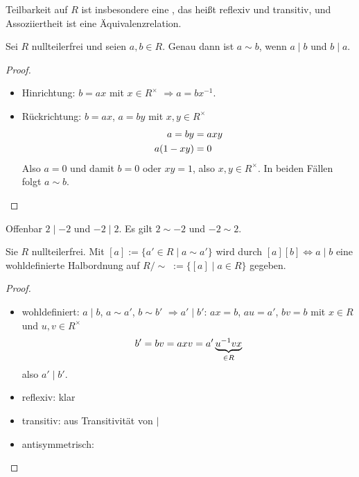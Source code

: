 \begin{remark}
	Teilbarkeit auf $R$ ist insbesondere eine , das heißt reflexiv und transitiv, und Assoziiertheit ist eine Äquivalenzrelation.
\end{remark}

\begin{lemma}
	Sei $R$ nullteilerfrei und seien $a,b\in R$. Genau dann ist $a\sim b$, wenn $a\mid b$ und $b\mid a$.
\end{lemma}
\begin{proof}
	\begin{itemize}
		\item Hinrichtung: $b=ax$ mit $x\in R^\times$ $\Rightarrow a=bx^{-1}$.
		\item Rückrichtung: $b=ax$, $a=by$ mit $x,y\in R^\times$
		\begin{align}
			a=by&=axy \notag \\
			a(1-xy)&= 0 \notag
		\end{align}
		Also $a=0$ und damit $b=0$ oder $xy=1$, also $x,y\in R^\times$. In beiden Fällen folgt $a\sim b$.
	\end{itemize}
\end{proof}

\begin{*example}
	Offenbar $2\mid -2$ und $-2\mid 2$. Es gilt $2\sim -2$ und $-2\sim 2$.
\end{*example}

\begin{proposition}
	Sie $R$ nullteilerfrei. Mit $[a] := \{a'\in R\mid a\sim a'\}$
	wird durch $[a][b]\iff a\mid b$ eine wohldefinierte Halbordnung auf $R/\sim\; := \{[a]\mid a\in R\}$
	gegeben.
\end{proposition}
\begin{proof}
	\begin{itemize}
		\item wohldefiniert: $a\mid b$, $a\sim a'$, $b\sim b'$ $\Rightarrow a'\mid b'$: $ax=b$, $au=a'$, $bv=b$ mit $x\in R$ und $u,v\in R^\times$
		\begin{align}
			b'=bv=axv=a'\underbrace{u^{-1}vx}_{\in R}\notag
		\end{align}
		also $a'\mid b'$.
		\item reflexiv: klar
		\item transitiv: aus Transitivität von $\mid$
		\item antisymmetrisch: 
	\end{itemize}
\end{proof}

